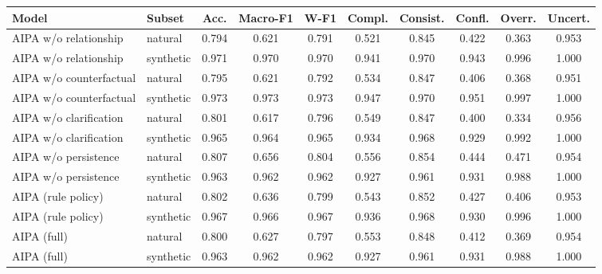 \begin{tabular}{llcccccccc}
\toprule
Model & Subset & Acc. & Macro-F1 & W-F1 & Compl. & Consist. & Confl. & Overr. & Uncert. \\
\midrule
AIPA w/o relationship & natural & 0.794 & 0.621 & 0.791 & 0.521 & 0.845 & 0.422 & 0.363 & 0.953 \\
AIPA w/o relationship & synthetic & 0.971 & 0.970 & 0.970 & 0.941 & 0.970 & 0.943 & 0.996 & 1.000 \\
AIPA w/o counterfactual & natural & 0.795 & 0.621 & 0.792 & 0.534 & 0.847 & 0.406 & 0.368 & 0.951 \\
AIPA w/o counterfactual & synthetic & 0.973 & 0.973 & 0.973 & 0.947 & 0.970 & 0.951 & 0.997 & 1.000 \\
AIPA w/o clarification & natural & 0.801 & 0.617 & 0.796 & 0.549 & 0.847 & 0.400 & 0.334 & 0.956 \\
AIPA w/o clarification & synthetic & 0.965 & 0.964 & 0.965 & 0.934 & 0.968 & 0.929 & 0.992 & 1.000 \\
AIPA w/o persistence & natural & 0.807 & 0.656 & 0.804 & 0.556 & 0.854 & 0.444 & 0.471 & 0.954 \\
AIPA w/o persistence & synthetic & 0.963 & 0.962 & 0.962 & 0.927 & 0.961 & 0.931 & 0.988 & 1.000 \\
AIPA (rule policy) & natural & 0.802 & 0.636 & 0.799 & 0.543 & 0.852 & 0.427 & 0.406 & 0.953 \\
AIPA (rule policy) & synthetic & 0.967 & 0.966 & 0.967 & 0.936 & 0.968 & 0.930 & 0.996 & 1.000 \\
AIPA (full) & natural & 0.800 & 0.627 & 0.797 & 0.553 & 0.848 & 0.412 & 0.369 & 0.954 \\
AIPA (full) & synthetic & 0.963 & 0.962 & 0.962 & 0.927 & 0.961 & 0.931 & 0.988 & 1.000 \\
\bottomrule
\end{tabular}
